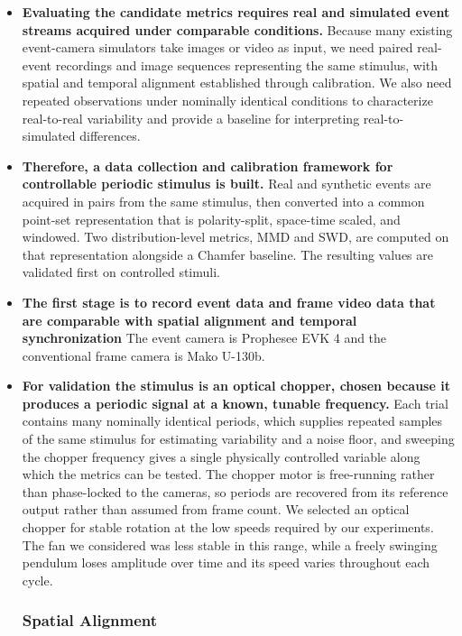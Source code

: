 \begin{itemize}
  \item \textbf{Evaluating the candidate metrics requires real and simulated event streams acquired under comparable conditions.} Because many existing event-camera simulators take images or video as input, we need paired real-event recordings and image sequences representing the same stimulus, with spatial and temporal alignment established through calibration. We also need repeated observations under nominally identical conditions to characterize real-to-real variability and provide a baseline for interpreting real-to-simulated differences.

  \item \textbf{Therefore, a data collection and calibration framework for controllable periodic stimulus is built.} Real and synthetic events are acquired in pairs from the same stimulus, then converted into a common point-set representation that is polarity-split, space-time scaled, and windowed. Two distribution-level metrics, MMD and SWD, are computed on that representation alongside a Chamfer baseline. The resulting values are validated first on controlled stimuli.
  
  \item \textbf{The first stage is to record event data and frame video data that are comparable with spatial alignment and temporal synchronization} The event camera is Prophesee EVK 4 and the conventional frame camera is Mako U-130b. 

  \item \textbf{For validation the stimulus is an optical chopper, chosen because it produces a periodic signal at a known, tunable frequency.} Each trial contains many nominally identical periods, which supplies repeated samples of the same stimulus for estimating variability and a noise floor, and sweeping the chopper frequency gives a single physically controlled variable along which the metrics can be tested. The chopper motor is free-running rather than phase-locked to the cameras, so periods are recovered from its reference output rather than assumed from frame count. We selected an optical chopper for stable rotation at the low speeds required by our experiments. The fan we considered was less stable in this range, while a freely swinging pendulum loses amplitude over time and its speed varies throughout each cycle.

\subsubsection{Spatial Alignment}


\end{itemize}
